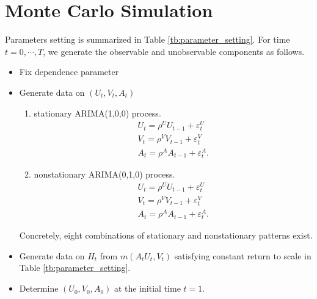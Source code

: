 \documentclass[12pt]{article}
\begin{document}
\section{Monte Carlo Simulation}
Parameters setting is summarized in Table \ref{tb:parameter_setting}.
For time $t=0,\cdots, T$, we generate the observable and unobservable components as follows.
\begin{itemize}
    \item Fix dependence parameter
    \item Generate data on $(U_t,V_t,A_t)$ 
    \begin{enumerate}
        \item stationary ARIMA(1,0,0) process.
        \begin{align*}
        U_t = \rho^{U} U_{t-1} + \varepsilon_{t}^{U}\\
        V_t = \rho^{V} V_{t-1} + \varepsilon_{t}^{V} \\
        A_{t}=\rho^{A} A_{t-1} + \varepsilon_{t}^{A}.
        \end{align*}
        \item nonstationary ARIMA(0,1,0) process.
        \begin{align*}
        U_t = \rho^{U} U_{t-1} + \varepsilon_{t}^{U}\\
        V_t = \rho^{V} V_{t-1} + \varepsilon_{t}^{V} \\
        A_{t}=\rho^{A} A_{t-1} + \varepsilon_{t}^{A}.
        \end{align*}
    \end{enumerate}
    Concretely, eight combinations of stationary and nonstationary patterns exist.
    
    \item Generate data on $H_t$ from  $m(A_t U_t,V_t)$ satisfying constant return to scale in Table \ref{tb:parameter_setting}.
    \item Determine $(U_0,V_0,A_0)$ at the initial time $t=1$. 
\end{itemize}
\end{document}
